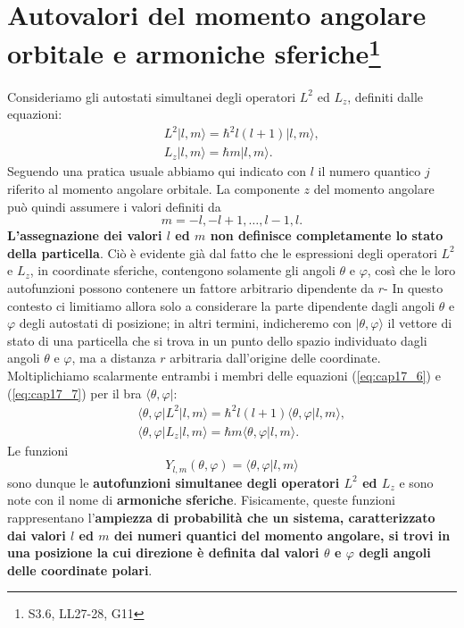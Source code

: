 \documentclass[a4paper,12pt,oneside]{book}
\begin{document}
\section[Autovalori del momento angolare orbitale e armoniche sferiche]{Autovalori del momento angolare orbitale e armoniche sferiche\footnote{S3.6, LL27-28, G11}}
Consideriamo gli autostati simultanei degli operatori $L^2$ ed $L_z$, definiti dalle equazioni:
\begin{eqnarray}
& &L^2 \vert l, m \rangle = \hbar ^2 l(l+1) \vert l, m \rangle ,\label{eq:cap17_6}\\
& &L_z \vert l, m \rangle = \hbar m \vert l, m \rangle \label{eq:cap17_7}.
\end{eqnarray}
Seguendo una pratica usuale abbiamo qui indicato con $l$ il numero quantico $j$ riferito al momento angolare orbitale. La componente $z$ del momento angolare può quindi assumere i valori definiti da
\begin{equation}
m = -l, -l+1, \dots,l-1, l .
\end{equation}
\textbf{L'assegnazione dei valori $l$ ed $m$ non definisce completamente lo stato della particella}. Ciò è evidente già dal fatto che le espressioni degli operatori $L^2$ e $L_z$, in coordinate sferiche, contengono solamente gli angoli $\theta$ e $\varphi$, così che le loro autofunzioni possono contenere un fattore arbitrario dipendente da $r$- In questo contesto ci limitiamo allora solo a considerare la parte dipendente dagli angoli $\theta$ e $\varphi$ degli autostati di posizione; in altri termini, indicheremo con $\vert \theta ,\varphi\rangle$ il vettore di stato di una particella che si trova in un punto dello spazio individuato dagli angoli $\theta $ e $\varphi$, ma a distanza $r$ arbitraria dall'origine delle coordinate.\\
Moltiplichiamo scalarmente entrambi i membri delle equazioni (\ref{eq:cap17_6}) e (\ref{eq:cap17_7}) per il bra $\langle \theta , \varphi \vert$:
\begin{eqnarray}
& &\langle \theta , \varphi \vert L^2 \vert l, m \rangle = \hbar ^2 l(l+1) \langle \theta , \varphi \vert l, m \rangle ,\\
& &\langle \theta , \varphi \vert L_z \vert l, m \rangle = \hbar m\langle \theta , \varphi \vert l, m \rangle .
\end{eqnarray}
Le funzioni
\begin{equation}
Y_{l,m} (\theta, \varphi )= \langle \theta , \varphi \vert l, m \rangle 
\end{equation}
sono dunque le \textbf{autofunzioni simultanee degli operatori $L^2$ ed $L_z$} e sono note con il nome di \textbf{armoniche sferiche}. Fisicamente, queste funzioni rappresentano l'\textbf{ampiezza di probabilità che un sistema, caratterizzato dai valori $l$ ed $m$ dei numeri quantici del momento angolare, si trovi in una posizione la cui direzione è definita dal valori $\theta$ e $\varphi$ degli angoli delle coordinate polari}.\\
\end{document}
